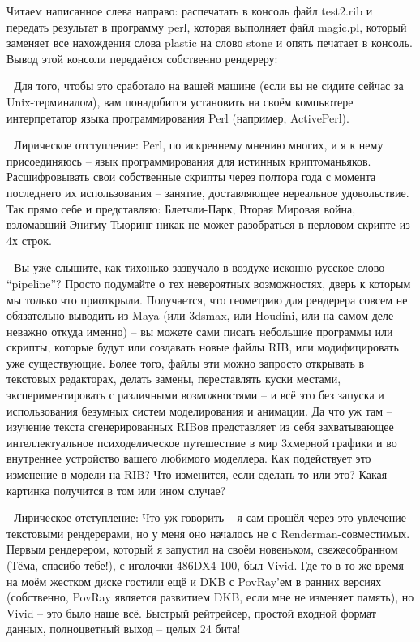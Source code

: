  Читаем написанное слева направо: распечатать в
    консоль файл test2.rib и передать результат в программу perl,
    которая выполняет файл magic.pl, который заменяет все нахождения
    слова plastic на слово stone и опять печатает в консоль. Вывод этой
    консоли передаётся собственно рендереру:

  
Для того, чтобы это сработало на вашей машине (если вы не сидите сейчас за Unix-терминалом), вам понадобится установить на своём
компьютере интерпретатор языка программирования Perl (например, ActivePerl).

  Лирическое
    отступление: Perl, по искреннему
    мнению многих, и я к нему присоединяюсь – язык программирования для
    истинных криптоманьяков. Расшифровывать свои собственные скрипты
    через полтора года с момента  последнего их использования –
    занятие, доставляющее нереальное удовольствие. Так прямо себе и
    представляю: Блетчли-Парк, Вторая Мировая война, взломавший Энигму
    Тьюринг никак не может разобраться в перловом скрипте из 4х
    строк.

  Вы уже слышите, как тихонько зазвучало в воздухе
    исконно русское слово “pipeline”? Просто подумайте о тех
    невероятных возможностях, дверь к которым мы только что приоткрыли.
    Получается, что геометрию для рендерера совсем не обязательно
    выводить из Maya (или 3dsmax, или Houdini, или на самом деле
    неважно откуда именно) – вы можете сами писать небольшие программы
    или скрипты, которые будут или создавать новые файлы RIB, или
    модифицировать уже существующие. Более того, файлы эти можно
    запросто открывать в текстовых редакторах, делать замены,
    переставлять куски местами, экспериментировать с различными
    возможностями – и всё это без запуска и использования безумных
    систем моделирования и анимации. Да что уж там – изучение текста
    сгенерированных RIBов представляет из себя захватывающее
    интеллектуальное психоделическое путешествие в мир 3хмерной графики
    и во внутреннее устройство вашего любимого моделлера. Как
    подействует это изменение в модели на RIB? Что изменится, если
    сделать то или это? Какая картинка получится в том или ином
    случае?

  Лирическое
    отступление: Что уж говорить – я
    сам прошёл через это увлечение текстовыми рендерерами, но у меня
    оно началось не с Renderman-совместимых. Первым рендерером, который
    я запустил на своём новеньком, свежесобранном (Тёма, спасибо тебе!),
    с иголочки 486DX4-100, был Vivid. Где-то в то же время на моём
    жестком диске гостили ещё и DKB с PovRay’ем в ранних версиях
    (собственно, PovRay является развитием DKB, если мне не изменяет
    память), но Vivid – это было наше всё. Быстрый рейтрейсер, простой
    входной формат данных, полноцветный выход – целых 24
    бита!

